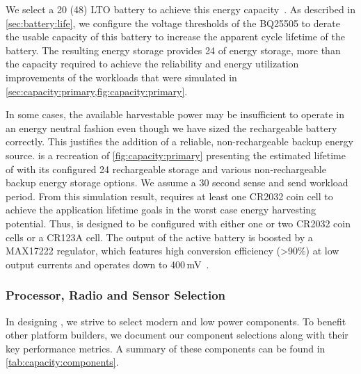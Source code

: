 We select a 20\ssi{\milli\Ah} (48\ssi{\milli\Wh}) LTO battery 
to achieve this energy capacity~\cite{LTODatasheet, LTODatasheet2}.
As described in \cref{sec:battery:life},
we configure the voltage thresholds of the BQ25505 to derate the 
usable capacity of this battery to  
increase the apparent cycle lifetime of the battery. 
The resulting energy storage provides 24\ssi{\milli\Wh} of
energy storage, more than the capacity required to achieve the reliability and energy utilization
improvements of the workloads that were simulated in \cref{sec:capacity:primary,fig:capacity:primary}.

In some cases, the available harvestable power may be insufficient to operate in an energy neutral fashion even though we have sized the rechargeable battery correctly.
This justifies the addition of a reliable, non-rechargeable backup energy source.
 is a recreation of \cref{fig:capacity:primary} presenting the estimated lifetime of \name with its configured 24\ssi{\micro\Wh} rechargeable storage and various non-rechargeable backup energy storage options. We assume a 30 second sense and send workload period.
From this simulation result, \name requires at least one CR2032 coin cell to achieve the application lifetime goals in the worst case energy harvesting potential.
Thus, \name is designed to be configured with either one or two CR2032 coin
cells or a CR123A cell. 
The output of the active battery
is boosted by a MAX17222 regulator, which features high conversion efficiency
(>90\%) at low output currents and operates down to 400\,mV~\cite{max17222}.

\subsubsection{Processor, Radio and Sensor Selection}
In designing \name, we strive to select modern and low power components.
To benefit other
platform builders, we document our component selections
along with their key performance metrics. A summary of these
components can be found in \cref{tab:capacity:components}.

